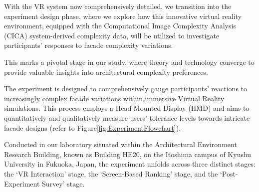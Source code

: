 %    

With the VR system now comprehensively detailed, we transition into the experiment design phase, where we explore how this innovative virtual reality environment, equipped with the Computational Image Complexity Analysis (CICA) system-derived complexity data, will be utilized to investigate participants' responses to facade complexity variations.

This marks a pivotal stage in our study, where theory and technology converge to provide valuable insights into architectural complexity preferences.

The experiment is designed to comprehensively gauge participants' reactions to increasingly complex facade variations within immersive Virtual Reality simulations.
This process employs a Head-Mounted Display (HMD) and aims to quantitatively and qualitatively measure users' tolerance levels towards intricate facade designs (refer to Figure\ref{fig:ExperimentFlowchart}).

Conducted in our laboratory situated within the Architectural Environment Research Building, known as Building HE20, on the Itoshima campus of Kyushu University in Fukuoka, Japan, the experiment unfolds across three distinct stages: the `VR Interaction' stage, the `Screen-Based Ranking' stage, and the `Post-Experiment Survey' stage.

